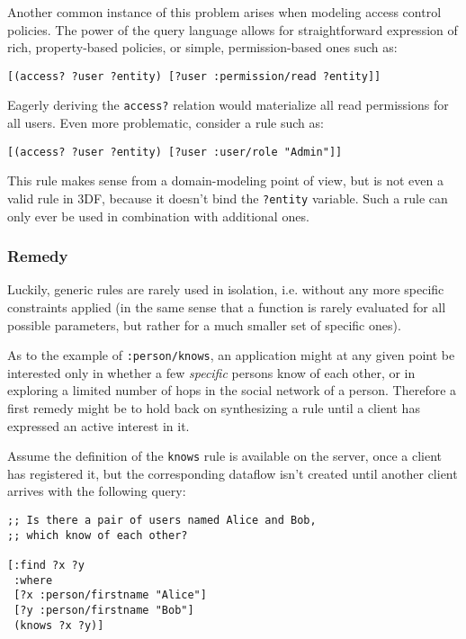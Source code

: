 \documentclass[../catalog.tex]{subfiles}
\begin{document}
Another common instance of this problem arises when modeling access
control policies. The power of the query language allows for
straightforward expression of rich, property-based policies, or
simple, permission-based ones such as:

\begin{verbatim}
[(access? ?user ?entity) [?user :permission/read ?entity]]
\end{verbatim}

Eagerly deriving the \texttt{access?} relation would materialize all
read permissions for all users. Even more problematic, consider a rule
such as:

\begin{verbatim}
[(access? ?user ?entity) [?user :user/role "Admin"]]
\end{verbatim}

This rule makes sense from a domain-modeling point of view, but is not
even a valid rule in 3DF, because it doesn't bind the \texttt{?entity}
variable. Such a rule can only ever be used in combination with
additional ones.

\subsubsection{Remedy}

Luckily, generic rules are rarely used in isolation, i.e. without any
more specific constraints applied (in the same sense that a function
is rarely evaluated for all possible parameters, but rather for a much
smaller set of specific ones).

As to the example of \texttt{:person/knows}, an application might at
any given point be interested only in whether a few \emph{specific}
persons know of each other, or in exploring a limited number of hops
in the social network of a person. Therefore a first remedy might be
to hold back on synthesizing a rule until a client has expressed an
active interest in it.

Assume the definition of the \texttt{knows} rule is available on the
server, once a client has registered it, but the corresponding
dataflow isn't created until another client arrives with the following
query:

\begin{verbatim}
;; Is there a pair of users named Alice and Bob, 
;; which know of each other?

[:find ?x ?y
 :where
 [?x :person/firstname "Alice"]
 [?y :person/firstname "Bob"]
 (knows ?x ?y)]
\end{verbatim}
\end{document}
